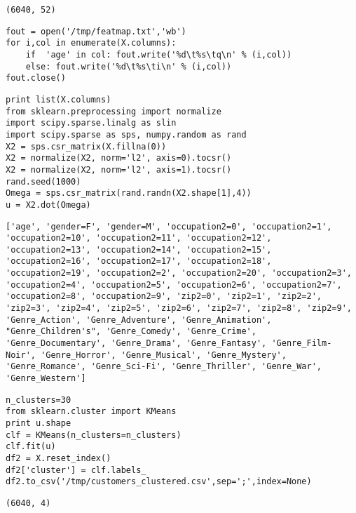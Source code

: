 \documentclass[12pt,fleqn]{article}\usepackage{../common}
\begin{document}
\begin{verbatim}
(6040, 52)
\end{verbatim}
\begin{verbatim}
fout = open('/tmp/featmap.txt','wb')
for i,col in enumerate(X.columns):
    if  'age' in col: fout.write('%d\t%s\tq\n' % (i,col))
    else: fout.write('%d\t%s\ti\n' % (i,col))    
fout.close()
\end{verbatim}

\begin{verbatim}
print list(X.columns)
from sklearn.preprocessing import normalize
import scipy.sparse.linalg as slin
import scipy.sparse as sps, numpy.random as rand
X2 = sps.csr_matrix(X.fillna(0))
X2 = normalize(X2, norm='l2', axis=0).tocsr()
X2 = normalize(X2, norm='l2', axis=1).tocsr()    
rand.seed(1000)
Omega = sps.csr_matrix(rand.randn(X2.shape[1],4))
u = X2.dot(Omega)
\end{verbatim}

\begin{verbatim}
['age', 'gender=F', 'gender=M', 'occupation2=0', 'occupation2=1', 'occupation2=10', 'occupation2=11', 'occupation2=12', 'occupation2=13', 'occupation2=14', 'occupation2=15', 'occupation2=16', 'occupation2=17', 'occupation2=18', 'occupation2=19', 'occupation2=2', 'occupation2=20', 'occupation2=3', 'occupation2=4', 'occupation2=5', 'occupation2=6', 'occupation2=7', 'occupation2=8', 'occupation2=9', 'zip2=0', 'zip2=1', 'zip2=2', 'zip2=3', 'zip2=4', 'zip2=5', 'zip2=6', 'zip2=7', 'zip2=8', 'zip2=9', 'Genre_Action', 'Genre_Adventure', 'Genre_Animation', "Genre_Children's", 'Genre_Comedy', 'Genre_Crime', 'Genre_Documentary', 'Genre_Drama', 'Genre_Fantasy', 'Genre_Film-Noir', 'Genre_Horror', 'Genre_Musical', 'Genre_Mystery', 'Genre_Romance', 'Genre_Sci-Fi', 'Genre_Thriller', 'Genre_War', 'Genre_Western']
\end{verbatim}

\begin{verbatim}
n_clusters=30
from sklearn.cluster import KMeans
print u.shape
clf = KMeans(n_clusters=n_clusters)
clf.fit(u)    
df2 = X.reset_index()
df2['cluster'] = clf.labels_
df2.to_csv('/tmp/customers_clustered.csv',sep=';',index=None)
\end{verbatim}

\begin{verbatim}
(6040, 4)
\end{verbatim}
\end{document}
